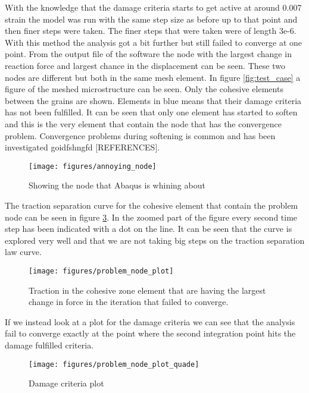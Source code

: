 \documentclass[wcco.tex]{subfiles}
\begin{document}
With the knowledge that the damage criteria starts to get active at around 0.007 strain the model was run with the same step size as before up to that point and then finer steps were taken. The finer steps that were taken were of length 3e-6. With this method the analysis got a bit further but still failed to converge at one point. From the output file of the software the node with the largest change in reaction force and largest chance in the displacement can be seen. These two nodes are different but both in the same mesh element. In figure \ref{fig:test_case} a figure of the meshed microstructure can be seen. Only the cohesive elements between the grains are shown. Elements in blue means that their damage criteria has not been fulfilled. It can be seen that only one element has started to soften and this is the very element that contain the node that has the convergence problem. Convergence problems during softening is common and has been investigated goidfshngfd [REFERENCES].

\begin{figure}[ht]
\centering
\texttt{[image: figures/annoying\_node]}
\caption{Showing the node that Abaqus is whining about}
\label{fig:annoying_node}
\end{figure}

The traction separation curve for the cohesive element that contain the problem node can be seen in figure \ref{fig:prob_node_plot}.  In the zoomed part of the figure every second time step has been indicated with a dot on the line. It can be seen that the curve is explored very well and that we are not taking big steps on the traction separation law curve. 

\begin{figure}[ht]
\centering
\texttt{[image: figures/problem\_node\_plot]}
\caption{Traction in the cohesive zone element that are having the largest change in force in the iteration that failed to converge.}
\label{fig:prob_node_plot}
\end{figure}

If we instead look at a plot for the damage criteria we can see that the analysis fail to converge exactly at the point where the second integration point hits the damage fulfilled criteria.

\begin{figure}[ht]
\centering
\texttt{[image: figures/problem\_node\_plot\_quade]}
\caption{Damage criteria plot}
\label{fig:prob_node_plot}
\end{figure}
\end{document}
